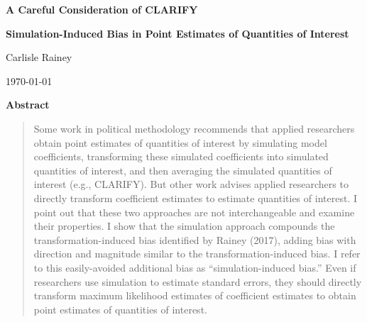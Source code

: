 \documentclass[12pt]{article}
\begin{document}
\begin{center}

{\Large \textbf{A Careful Consideration of CLARIFY}%
}

\vspace{0.2cm}


{\textbf{Simulation-Induced Bias in Point Estimates of Quantities of Interest}}



\vspace{1cm}

Carlisle Rainey

\vspace{1cm}
\today
\end{center}
\vspace{5mm}



{\centerline{\textbf{Abstract}}}
\begin{quote}\noindent
Some work in political methodology recommends that applied researchers obtain point estimates of quantities of interest by simulating model coefficients, transforming these simulated coefficients into simulated quantities of interest, and then averaging the simulated quantities of interest (e.g., CLARIFY). 
But other work advises applied researchers to directly transform coefficient estimates to estimate quantities of interest. 
I point out that these two approaches are not interchangeable and examine their properties. 
I show that the simulation approach compounds the transformation-induced bias identified by Rainey (2017), adding bias with direction and magnitude similar to the transformation-induced bias. I refer to this easily-avoided additional bias as ``simulation-induced bias.'' Even if researchers use simulation to estimate standard errors, they should directly transform maximum likelihood estimates of coefficient estimates to obtain point estimates of quantities of interest.
\end{quote}
\end{document}
